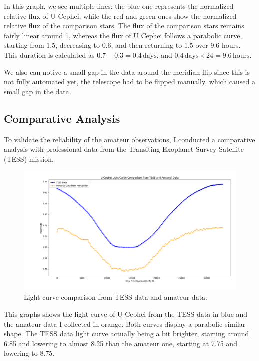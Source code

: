 \documentclass[12pt,a4paper]{article}
\begin{document}
In this graph, we see multiple lines: the blue one represents the normalized relative flux of U Cephei, while the red and green ones show the normalized relative flux of the comparison stars. The flux of the comparison stars remains fairly linear around 1, 
whereas the flux of U Cephei follows a parabolic curve, starting from 1.5, decreasing to 0.6, and then returning to 1.5 over 9.6 hours. This duration is calculated as \( 0.7 - 0.3 = 0.4 \, \text{days} \), and \( 0.4 \, \text{days} \times 24 = 9.6 \, \text{hours} \).

\medskip

We also can notive a small gap in the data around the meridian flip since this is not fully automated yet, the telescope had to be flipped manually, which caused a small gap in the data.

\bigskip


\subsection{Comparative Analysis}

To validate the reliability of the amateur observations, I conducted a comparative analysis with professional data from the Transiting Exoplanet Survey Satellite (TESS) mission.

\begin{figure}[H]
    \centering
    \includegraphics[width=1\textwidth]{assets/comparison.png}
    \caption{Light curve comparison from TESS data and amateur data.}
    \label{fig:tess-data-comparison}
\end{figure}

This graphs shows the light curve of U Cephei from the TESS data in blue and the amateur data I collected in orange. 
Both curves display a parabolic similar shape. The TESS data light curve actually being a bit brighter, starting around 6.85 and lowering to almost 8.25 than the amateur one, starting at 7.75 and lowering to 8.75.
\end{document}
